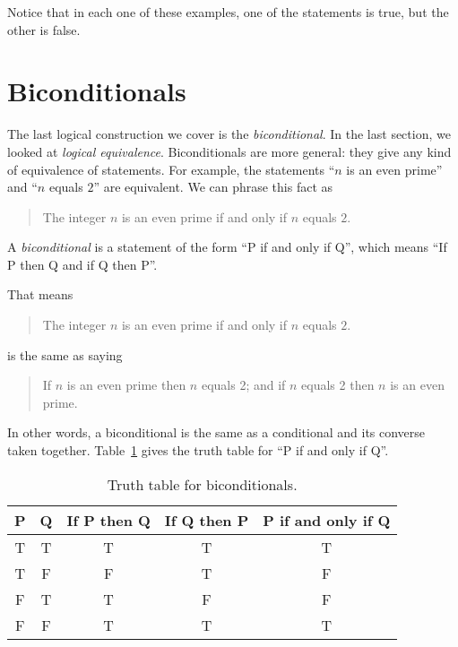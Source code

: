 \documentclass{tufte-book}
\begin{document}
Notice that in each one of these examples, one of the statements is true, but the other is false.



\section{Biconditionals}
\label{sec:biconditionals}

The last logical construction we cover is the \emph{biconditional}. In the last section, we looked at \emph{logical equivalence}. Biconditionals are more general: they give any kind of equivalence of statements. For example, the statements ``$n$ is an even prime'' and ``$n$ equals $2$'' are equivalent. We can phrase this fact as
\begin{quote}
  The integer $n$ is an even prime if and only if $n$ equals $2$.
\end{quote}

\begin{definition}
  A \emph{biconditional} is a statement of the form ``P if and only if Q'', which means ``If P then Q and if Q then P''.
\end{definition}

That means
\begin{quote}
  The integer $n$ is an even prime if and only if $n$ equals $2$.
\end{quote}
is the same as saying
\begin{quote}
  If $n$ is an even prime then $n$ equals 2; and if $n$ equals 2 then $n$ is an even prime.
\end{quote}
In other words, a biconditional is the same as a conditional and its converse taken together. Table~\ref{tab:truth-table-iff} gives the truth table for ``P if and only if Q''.

\begin{table}
  \centering
  \begin{tabular}{ccccc}
    \toprule
    P & Q & If P then Q & If Q then P & P if and only if Q \\ \midrule
    T & T & T & T & T\\
    T & F & F & T & F\\
    F & T & T & F & F\\
    F & F & T & T & T\\ \bottomrule
  \end{tabular}
  \caption{Truth table for biconditionals.}
  \label{tab:truth-table-iff}
\end{table}
\end{document}
